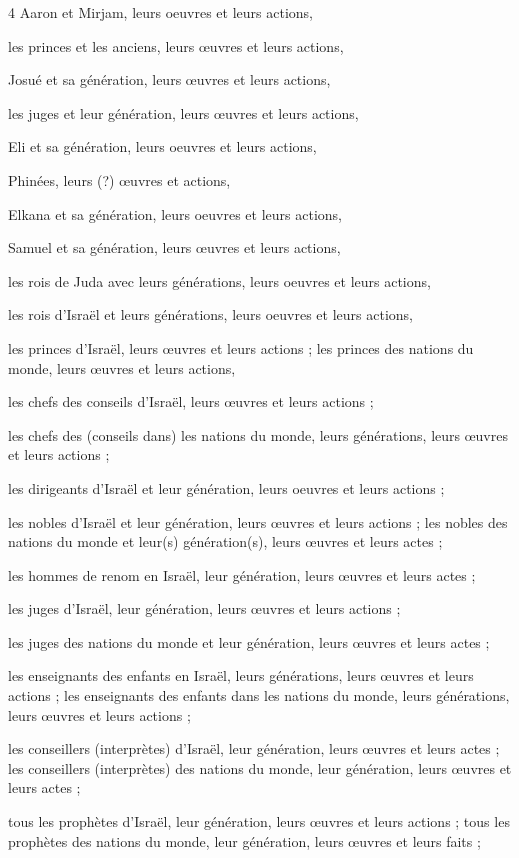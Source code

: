 \par 4 Aaron et Mirjam, leurs oeuvres et leurs actions,
\par les princes et les anciens, leurs œuvres et leurs actions,
\par Josué et sa génération, leurs œuvres et leurs actions,
\par les juges et leur génération, leurs œuvres et leurs actions,
\par Eli et sa génération, leurs oeuvres et leurs actions,
\par Phinées, leurs (?) œuvres et actions,
\par Elkana et sa génération, leurs oeuvres et leurs actions,
\par Samuel et sa génération, leurs œuvres et leurs actions,
\par les rois de Juda avec leurs générations, leurs oeuvres et leurs actions,
\par les rois d'Israël et leurs générations, leurs oeuvres et leurs actions,
\par les princes d'Israël, leurs œuvres et leurs actions ; les princes des nations du monde, leurs œuvres et leurs actions,
\par les chefs des conseils d'Israël, leurs œuvres et leurs actions ;
\par les chefs des (conseils dans) les nations du monde, leurs générations, leurs œuvres et leurs actions ;
\par les dirigeants d'Israël et leur génération, leurs oeuvres et leurs actions ;
\par les nobles d'Israël et leur génération, leurs œuvres et leurs actions ; les nobles des nations du monde et leur(s) génération(s), leurs œuvres et leurs actes ;
\par les hommes de renom en Israël, leur génération, leurs œuvres et leurs actes ;
\par les juges d'Israël, leur génération, leurs œuvres et leurs actions ;
\par les juges des nations du monde et leur génération, leurs œuvres et leurs actes ;
\par les enseignants des enfants en Israël, leurs générations, leurs œuvres et leurs actions ; les enseignants des enfants dans les nations du monde, leurs générations, leurs œuvres et leurs actions ;
\par les conseillers (interprètes) d'Israël, leur génération, leurs œuvres et leurs actes ; les conseillers (interprètes) des nations du monde, leur génération, leurs œuvres et leurs actes ;
\par tous les prophètes d'Israël, leur génération, leurs œuvres et leurs actions ; tous les prophètes des nations du monde, leur génération, leurs œuvres et leurs faits ;

